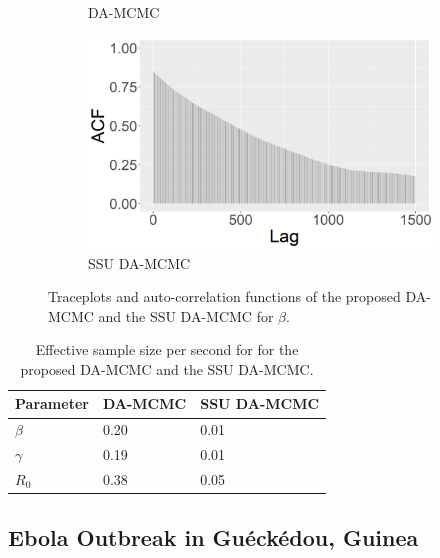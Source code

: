 \documentclass[11pt]{article}
\begin{document}
\begin{figure}
\begin{subfigure}[b]{0.42\textwidth}
			\caption{DA-MCMC}
			\label{fig:E6_burn_beta_acf_joint}
		\end{subfigure}
		\hfill
		\begin{subfigure}[b]{0.41\textwidth}
			\centering
			\includegraphics[width=\textwidth]{E6_burn_beta_acf_single.jpg}
			\caption{SSU DA-MCMC}
			\label{fig:E6_burn_beta_acf_single}
		\end{subfigure}
		\caption{Traceplots and auto-correlation functions of the proposed DA-MCMC and the SSU DA-MCMC for $\beta$.}
		\label{fig:E6}
	\end{figure}
	
	 \begin{table}
        \centering
        \begin{tabular}{ |C{2cm}| *{2}{C{3cm}}|}
            \hline
            Parameter & DA-MCMC & SSU DA-MCMC \\ 
            \hline
            $\beta$ & 0.20 & 0.01 \\ 
            $\gamma$ & 0.19 & 0.01 \\ 
            $R_0$ & 0.38 & 0.05 \\
            \hline
        \end{tabular}
        \caption{Effective sample size per second for for the proposed DA-MCMC and the SSU DA-MCMC.}
        \label{tab:E6}
    \end{table}
	
	\subsection{Ebola Outbreak in Gu\'eck\'edou, Guinea}
	\label{sec:ebo}
	
\end{document}
